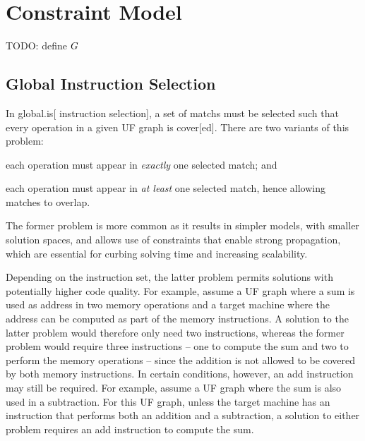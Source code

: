%

\chapter{Constraint Model}

TODO: define $G$

\section{Global Instruction Selection}

In \gls{global.is}[ \gls{instruction selection}], a set of \glspl{match} must be
selected such that every \gls{operation} in a given \gls{UF graph} is
\gls{cover}[ed].
%
There are two variants of this problem:
%
\begin{enumerateinline}
  \item each \gls{operation} must appear in \emph{exactly} one selected
    \gls{match}; and
%
  \item each \gls{operation} must appear in \emph{at least} one selected
    \gls{match}, hence allowing matches to \gls{overlap}.
\end{enumerateinline}
%
The former problem is more common as it results in simpler models, with smaller
\glspl{solution space}, and allows use of \glspl{constraint} that enable strong
\gls{propagation}, which are essential for curbing solving time and increasing
scalability.

Depending on the \gls{instruction set}, the latter problem permits
\glspl{solution} with potentially higher code quality.
%
For example, assume a \gls{UF graph} where a sum is used as address in two
memory operations and a \gls{target machine} where the address can be computed
as part of the memory instructions.
%
A \gls{solution} to the latter problem would therefore only need two
instructions, whereas the former problem would require three instructions -- one
to compute the sum and two to perform the memory operations -- since the
addition is not allowed to be covered by both memory instructions.
%
In certain conditions, however, an add instruction may still be required.
%
For example, assume a \gls{UF graph} where the sum is also used in a
subtraction.
%
For this \gls{UF graph}, unless the \gls{target machine} has an instruction that
performs both an addition and a subtraction, a \gls{solution} to either problem
requires an add instruction to compute the sum.

